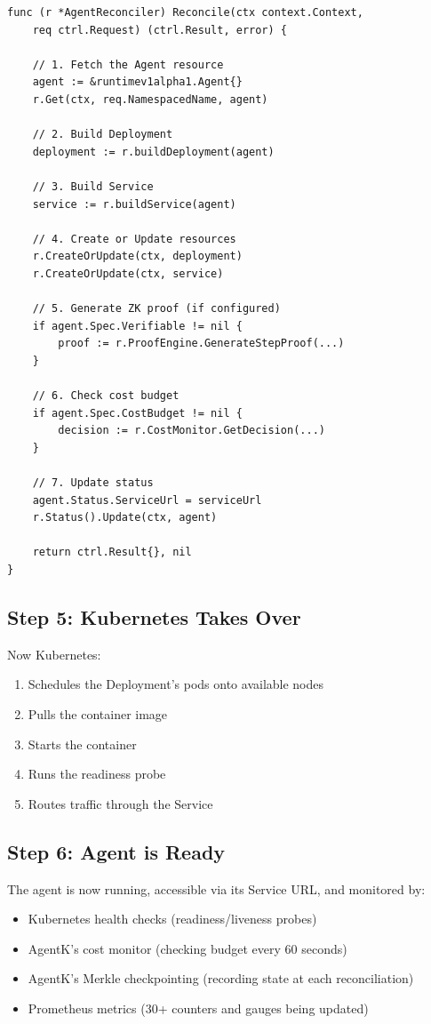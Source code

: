 \documentclass[12pt,a4paper,openany]{report}
\begin{document}
\begin{lstlisting}[style=golang, caption={Simplified reconciler flow}]
func (r *AgentReconciler) Reconcile(ctx context.Context,
    req ctrl.Request) (ctrl.Result, error) {

    // 1. Fetch the Agent resource
    agent := &runtimev1alpha1.Agent{}
    r.Get(ctx, req.NamespacedName, agent)

    // 2. Build Deployment
    deployment := r.buildDeployment(agent)

    // 3. Build Service
    service := r.buildService(agent)

    // 4. Create or Update resources
    r.CreateOrUpdate(ctx, deployment)
    r.CreateOrUpdate(ctx, service)

    // 5. Generate ZK proof (if configured)
    if agent.Spec.Verifiable != nil {
        proof := r.ProofEngine.GenerateStepProof(...)
    }

    // 6. Check cost budget
    if agent.Spec.CostBudget != nil {
        decision := r.CostMonitor.GetDecision(...)
    }

    // 7. Update status
    agent.Status.ServiceUrl = serviceUrl
    r.Status().Update(ctx, agent)

    return ctrl.Result{}, nil
}
\end{lstlisting}

\subsection{Step 5: Kubernetes Takes Over}

Now Kubernetes:
\begin{enumerate}
    \item Schedules the Deployment's pods onto available nodes
    \item Pulls the container image
    \item Starts the container
    \item Runs the readiness probe
    \item Routes traffic through the Service
\end{enumerate}

\subsection{Step 6: Agent is Ready}

The agent is now running, accessible via its Service URL, and monitored by:
\begin{itemize}
    \item Kubernetes health checks (readiness/liveness probes)
    \item AgentK's cost monitor (checking budget every 60 seconds)
    \item AgentK's Merkle checkpointing (recording state at each reconciliation)
    \item Prometheus metrics (30+ counters and gauges being updated)
\end{itemize}
\end{document}
